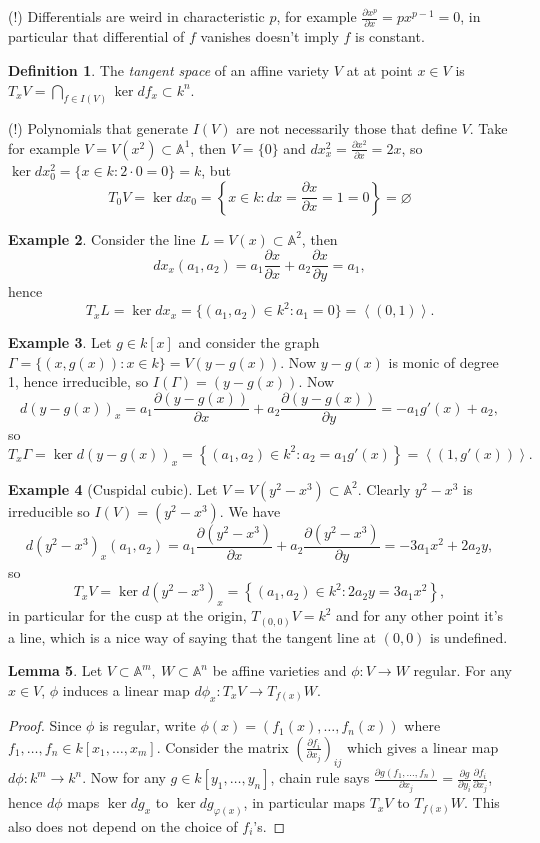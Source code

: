 \documentclass{article}
\newcommand{\la}{\left\langle}
\newcommand{\ra}{\right\rangle}
\newcommand{\A}{\mathbb{A}}
\theoremstyle{definition}
\newtheorem{defn}{Definition}[subsection]
\newtheorem{lemma}[defn]{Lemma}
\newtheorem{example}[defn]{Example}
\begin{document}
(!) Differentials are weird in characteristic $p$, for example $\frac{\partial x^p}{\partial x}=px^{p-1}=0$, in particular that differential of $f$ vanishes doesn't imply $f$ is constant.

\begin{defn}
The \textit{tangent space} of an affine variety $V$ at at point $x\in V$ is $T_xV=\bigcap_{f\in I(V)}\ker df_x\subset k^n$.
\end{defn}

(!) Polynomials that generate $I(V)$ are not necessarily those that define $V$. Take for example $V=V(x^2)\subset\A^1$, then $V=\{0\}$ and $dx^2_x=\frac{\partial x^2}{\partial x}=2x$, so $\ker dx^2_0=\{x\in k:2\cdot 0=0\}=k$, but
\[
T_0V=\ker dx_0=\left\{x\in k : dx=\frac{\partial x}{\partial x}=1=0\right\}=\varnothing
\]

\begin{example}
Consider the line $L=V(x)\subset\A^2$, then
\[
dx_x(a_1,a_2)=a_1\frac{\partial x}{\partial x}+a_2\frac{\partial x}{\partial y}=a_1,
\]
hence
\[
T_xL=\ker dx_x=\{(a_1,a_2)\in k^2:a_1=0\}=\la(0,1)\ra.
\]
\end{example}

\begin{example}
Let $g\in k[x]$ and consider the graph $\Gamma=\{(x,g(x)):x\in k\}=V(y-g(x))$. Now $y-g(x)$ is monic of degree 1, hence irreducible, so $I(\Gamma)=(y-g(x))$. Now
\[
d(y-g(x))_x=a_1\frac{\partial (y-g(x))}{\partial x}+a_2\frac{\partial (y-g(x))}{\partial y}=-a_1g'(x)+a_2,
\]
so
\[
T_x\Gamma=\ker d(y-g(x))_x=\left\{(a_1,a_2)\in k^2:a_2=a_1g'(x)\right\}=\la(1,g'(x))\ra.
\]
\end{example}

\begin{example}[Cuspidal cubic]
Let $V=V(y^2-x^3)\subset\A^2$. Clearly $y^2-x^3$ is irreducible so $I(V)=(y^2-x^3)$. We have
\[
d(y^2-x^3)_x(a_1,a_2)=a_1\frac{\partial (y^2-x^3)}{\partial x}+a_2\frac{\partial (y^2-x^3)}{\partial y}=-3a_1x^2+2a_2y,
\]
so
\[
T_xV=\ker d(y^2-x^3)_x=\left\{(a_1,a_2)\in k^2:2a_2y=3a_1x^2\right\},
\]
in particular for the cusp at the origin, $T_{(0,0)}V=k^2$ and for any other point it's a line, which is a nice way of saying that the tangent line at $(0,0)$ is undefined.
\end{example}

\begin{lemma}
Let $V\subset\A^m,\ W\subset\A^n$ be affine varieties and $\phi:V\rightarrow W$ regular. For any $x\in V$, $\phi$ induces a linear map $d\phi_x:T_xV\rightarrow T_{f(x)}W$.
\end{lemma}
\begin{proof}
Since $\phi$ is regular, write $\phi(x)=(f_1(x),\ldots,f_n(x))$ where $f_1,\ldots,f_n\in k[x_1,\ldots,x_m]$. Consider the matrix $\left(\frac{\partial f_i}{\partial x_j}\right)_{ij}$ which gives a linear map $d\phi:k^m\rightarrow k^n$. Now for any $g\in k[y_1,\ldots,y_n]$, chain rule says $\frac{\partial g(f_1,\ldots,f_n)}{\partial x_j}=\frac{\partial g}{\partial y_i}\frac{\partial f_i}{\partial x_j}$,
hence $d\phi$ maps $\ker dg_x$ to $\ker dg_{\varphi(x)}$, in particular maps $T_xV$ to $T_{f(x)}W$. This also does not depend on the choice of $f_i$'s.
\end{proof}
\end{document}
